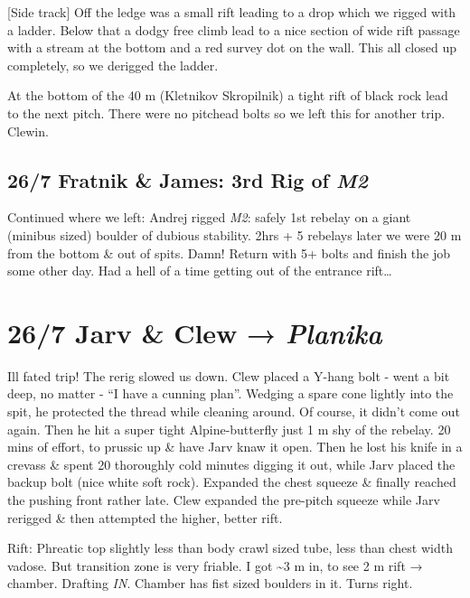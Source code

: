 {[}Side track{]} Off the ledge was a small rift leading to a drop which
we rigged with a ladder. Below that a dodgy free climb lead to a nice
section of wide rift passage with a stream at the bottom and a red
survey dot on the wall. This all closed up completely, so we derigged
the ladder.

At the bottom of the 40 m (Kletnikov Skropilnik) a tight rift of black
rock lead to the next pitch. There were no pitchead bolts so we left
this for another trip. Clewin.

\hypertarget{fratnik-james-3rd-rig-of-m2}{%
\subsection{\texorpdfstring{26/7 Fratnik \& James: 3rd Rig of
\emph{M2}}{26/7 Fratnik \& James: 3rd Rig of M2}}\label{fratnik-james-3rd-rig-of-m2}}

Continued where we left: Andrej rigged \emph{M2}: safely 1st rebelay on
a giant (minibus sized) boulder of dubious stability. 2hrs + 5 rebelays
later we were 20 m from the bottom \& out of spits. Damn! Return with 5+
bolts and finish the job some other day. Had a hell of a time getting
out of the entrance rift\ldots{}

\hypertarget{jarv-clew-planika}{%
\section{\texorpdfstring{26/7 Jarv \& Clew →
\emph{Planika}}{26/7 Jarv \& Clew → Planika}}\label{jarv-clew-planika}}

Ill fated trip! The rerig slowed us down. Clew placed a Y-hang bolt -
went a bit deep, no matter - ``I have a cunning plan''. Wedging a spare
cone lightly into the spit, he protected the thread while cleaning
around. Of course, it didn't come out again. Then he hit a super tight
Alpine-butterfly just 1 m shy of the rebelay. 20 mins of effort, to
prussic up \& have Jarv knaw it open. Then he lost his knife in a
crevass \& spent 20 thoroughly cold minutes digging it out, while Jarv
placed the backup bolt (nice white soft rock). Expanded the chest
squeeze \& finally reached the pushing front rather late. Clew expanded
the pre-pitch squeeze while Jarv rerigged \& then attempted the higher,
better rift.

Rift: Phreatic top slightly less than body crawl sized tube, less than
chest width vadose. But transition zone is very friable. I got
\textasciitilde3 m in, to see 2 m rift → chamber. Drafting \emph{IN}.
Chamber has fist sized boulders in it. Turns right.

